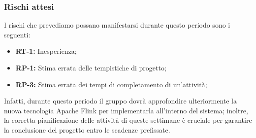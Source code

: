 \documentclass[8pt]{article}
\begin{document}
\subsubsection{Rischi attesi}
I rischi che prevediamo possano manifestarsi durante questo periodo sono i seguenti:
\begin{itemize}
\setlength\itemsep{0em}
    \item \textbf{RT-1:} Inesperienza;
    \item \textbf{RP-1:} Stima errata delle tempistiche di progetto;
    \item \textbf{RP-3:} Stima errata dei tempi di completamento di un'attività;
\end{itemize}
Infatti, durante questo periodo il gruppo dovrà approfondire ulteriormente la nuova tecnologia Apache Flink per implementarla all'interno del sistema; inoltre, la corretta pianificazione delle attività di queste settimane è cruciale per garantire la conclusione del progetto entro le scadenze prefissate.
\newpage
\end{document}

